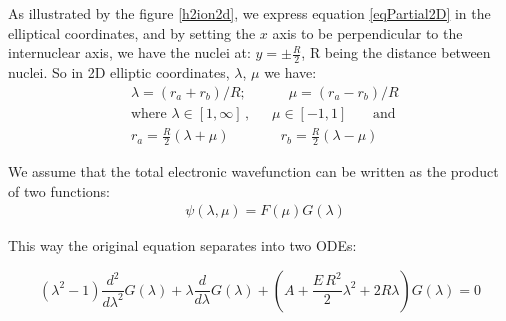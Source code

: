 As illustrated by the figure \ref{h2ion2d}, we express equation \eqref{eqPartial2D} in the elliptical coordinates, and by setting the $ x $ axis to be perpendicular to the internuclear axis, we have the nuclei at: $ y = \pm \frac{R}{2}  $, R being the distance between nuclei. So in  2D elliptic coordinates, $ \lambda $, $ \mu $ we have:
\begin{equation}\label{variables1}
\begin{split}
& \lambda = \left(r_a + r_b\right)/R;\,\,\,\,\,\,\,\,\,\,\,\,\,\,\,\,\,\,\mu =  \left(r_a - r_b\right)/R  \\[1em]
& \text{where } \lambda \in \left[1,\infty\right]\,,\,\,\,\,\,\,\,\,\,\mu \in \left[ -1, 1 \right]\,\,\,\,\,\,\,\,\,\text{ and } \\[.8em] 
& r_a = \frac{R}{2}\left(\lambda + \mu \right)\,\,\,\,\,\,\,\,\,\,\,\,\,\,\,\,\,\,\,\,\,\, r_b = \frac{R}{2}\left(\lambda - \mu \right)
\end{split}
\end{equation}

We assume that the total electronic wavefunction can be written as the product of two functions:
\begin{equation}\label{variables2}
\begin{split}
& \psi(\lambda,\mu) = F(\mu)G(\lambda)
\end{split}
\end{equation}

This way the original equation separates into two ODEs:

\begin{equation}\label{L2-1}
\left(\lambda^2 - 1 \right) \frac{d^2}{ d\lambda^2 }G(\lambda) + \lambda\frac{ d}{d\lambda }G (\lambda)  + \left(A + \frac{E\,R^2}{2}\lambda^2 + 2R\lambda  \right)G (\lambda) = 0  
\end{equation}

